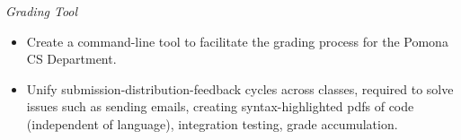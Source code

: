 {\sl Grading Tool}
\begin{itemize} \itemsep -2pt %
\item Create a command-line tool to facilitate the grading process for the Pomona CS Department.
\item Unify submission-distribution-feedback cycles across classes, required to solve issues such as sending emails, creating syntax-highlighted pdfs of code (independent of language), integration testing, grade accumulation.
\end{itemize}
